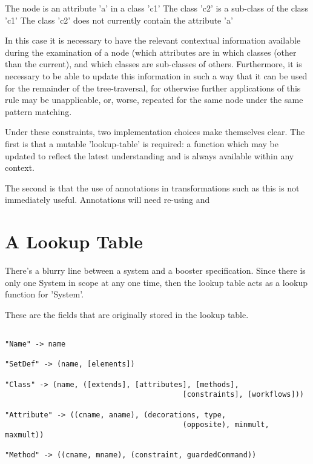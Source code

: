 The node is an attribute 'a' in a class 'c1'
The class 'c2' is a sub-class of the class 'c1'
The class 'c2' does not currently contain the attribute 'a'

In this case it is necessary to have the relevant contextual
information available during the examination of a node (which
attributes are in which classes (other than the current), and which
classes are sub-classes of others.  Furthermore, it is necessary to be
able to update this information in such a way that it can be used for
the remainder of the tree-traversal, for otherwise further
applications of this rule may be unapplicable, or, worse, repeated for
the same node under the same pattern matching.

Under these constraints, two implementation choices make themselves
clear.  The first is that a mutable 'lookup-table' is required: a
function which may be updated to reflect the latest understanding and
is always available within any context.

The second is that the use of annotations in transformations such as
this is not immediately useful.  Annotations will need re-using and  
 




\section{A Lookup Table}

There's a blurry line between a system and a booster specification.
Since there is only one System in scope at any one time, then the
lookup table acts as a lookup function for 'System'.

These are the fields that are originally stored in the lookup table.

\begin{verbatim}

"Name" -> name

"SetDef" -> (name, [elements])

"Class" -> (name, ([extends], [attributes], [methods], 
                                         [constraints], [workflows]))

"Attribute" -> ((cname, aname), (decorations, type, 
                                         (opposite), minmult, maxmult)) 

"Method" -> ((cname, mname), (constraint, guardedCommand))

\end{verbatim}
